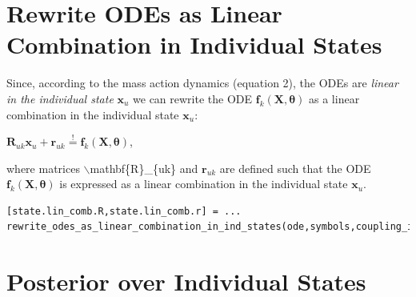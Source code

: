 \section{Rewrite ODEs as Linear Combination in Individual States}

\begin{par}
Since, according to the mass action dynamics (equation 2), the ODEs are \textit{linear in the individual state} $\mathbf{x}_u$ we can rewrite the ODE $\mathbf{f}_k(\mathbf{X},\boldsymbol\theta)$ as a linear combination in the individual state $\mathbf{x}_u$:
\end{par} \vspace{1em}
\begin{par}
$\mathbf{R}_{uk} \mathbf{x}_u + \mathbf{r}_{uk} \stackrel{!}{=}\mathbf{f}_k(\mathbf{X},\boldsymbol{\theta})$,
\end{par} \vspace{1em}
\begin{par}
where matrices  \ensuremath{\backslash}mathbf\{R\}\_\{uk\} and  $\mathbf{r}_{uk}$ are defined such that the ODE $\mathbf{f}_k(\mathbf{X},\boldsymbol{\theta})$ is expressed as a linear combination in the individual state $\mathbf{x}_u$.
\end{par} 
\color{RoyalPurple}\begin{verbatim}
[state.lin_comb.R,state.lin_comb.r] = ...
rewrite_odes_as_linear_combination_in_ind_states(ode,symbols,coupling_idx.states);
\end{verbatim} 
\color{black}


\section{Posterior over Individual States}

